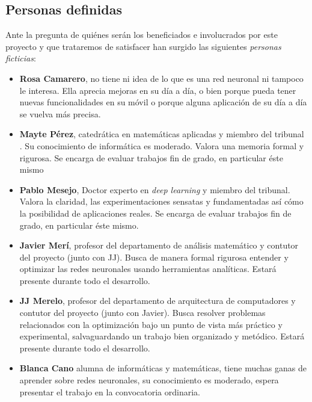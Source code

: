 \subsection{Personas definidas}  \label{ch:metodología_personas}

Ante la pregunta de quiénes serán los beneficiados e involucrados por este proyecto y que trataremos de satisfacer
han surgido 
las siguientes \textit{personas ficticias}:

\begin{itemize}

    \item \textbf{Rosa Camarero}, no tiene ni idea de lo que es una red neuronal ni tampoco le interesa.  Ella aprecia mejoras en su día a día, o bien porque pueda tener nuevas funcionalidades en su móvil o porque alguna 
    aplicación de su día a día se vuelva más precisa. 

    \item \textbf{Mayte Pérez}, catedrática en matemáticas aplicadas y miembro del tribunal . Su conocimiento
    de informática es moderado. Valora una memoria formal y rigurosa. Se encarga de evaluar trabajos fin de grado, en particular éste mismo
    
    \item \textbf{Pablo Mesejo}, Doctor experto en \textit{deep learning} y miembro del tribunal. Valora la claridad, las experimentaciones sensatas y fundamentadas así cómo la posibilidad de aplicaciones reales. Se encarga de evaluar trabajos fin de grado, en particular éste mismo. 
    
    \item \textbf{Javier Merí}, profesor del departamento de análisis matemático y contutor del proyecto (junto con JJ). Busca de manera formal rigurosa entender y optimizar las redes neuronales usando herramientas analíticas. Estará presente durante todo el desarrollo. 
    
    \item   \textbf{JJ Merelo}, profesor del departamento de arquitectura de computadores y contutor del proyecto (junto con Javier). 
    Busca resolver problemas relacionados con la optimización bajo un punto de vista más práctico y experimental, salvaguardando un trabajo bien organizado y metódico. Estará presente durante todo el desarrollo. 

    \item \textbf{Blanca Cano} alumna de informáticas y matemáticas, tiene muchas ganas de aprender sobre redes 
    neuronales, su conocimiento es moderado, espera presentar el trabajo en la convocatoria ordinaria. 

\end{itemize}

